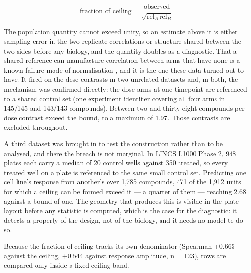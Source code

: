 \documentclass[11pt,a4paper]{article}
\begin{document}
\[\text{fraction of ceiling} = \frac{\text{observed}}{\sqrt{\mathrm{rel}_A\,\mathrm{rel}_B}}\]

The population quantity cannot exceed unity, so an estimate above it is
either sampling error in the two replicate correlations or structure
shared between the two sides before any biology, and the quantity
doubles as a diagnostic. That a shared reference can manufacture
correlation between arms that have none is a known failure mode of
normalisation \cite{ref54}, and it is the one these data turned out to have.
It fired on the dose contrasts in two unrelated datasets and, in both,
the mechanism was confirmed directly: the dose arms at one timepoint are
referenced to a shared control set (one experiment identifier covering
all four arms in 145/145 and 143/143 compounds). Between two and
thirty-eight compounds per dose contrast exceed the bound, to a maximum
of 1.97. Those contrasts are excluded throughout.

A third dataset was brought in to test the construction rather than to
be analysed, and there the breach is not marginal. In LINCS L1000 Phase
2, 948 plates each carry a median of 20 control wells against 350
treated, so every treated well on a plate is referenced to the same
small control set. Predicting one cell line's response from another's
over 1,785 compounds, 471 of the 1,912 units for which a ceiling can be
formed exceed it --- a quarter of them --- reaching 2.68 against a bound
of one. The geometry that produces this is visible in the plate layout
before any statistic is computed, which is the case for the diagnostic:
it detects a property of the design, not of the biology, and it needs no
model to do so.

Because the fraction of ceiling tracks its own denominator (Spearman
+0.665 against the ceiling, +0.544 against response amplitude, n = 123),
rows are compared only inside a fixed ceiling band.
\end{document}
